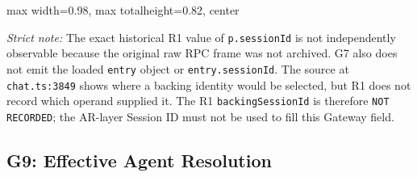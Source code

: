 \begin{center}
\begin{adjustbox}{
max width=0.98\textwidth,
max totalheight=0.82\textheight,
center
}

\end{adjustbox}

\end{center}

\textit{Strict note:}
The exact historical R1 value of \texttt{p.sessionId} is not
independently observable because the original raw RPC frame was not
archived. G7 also does not emit the loaded \texttt{entry} object or
\texttt{entry.sessionId}. The source at \texttt{chat.ts:3849} shows where
a backing identity would be selected, but R1 does not record which
operand supplied it. The R1 \texttt{backingSessionId} is therefore
\texttt{NOT RECORDED}; the AR-layer Session ID must not be used to fill
this Gateway field.


\subsection*{G9: Effective Agent Resolution}

